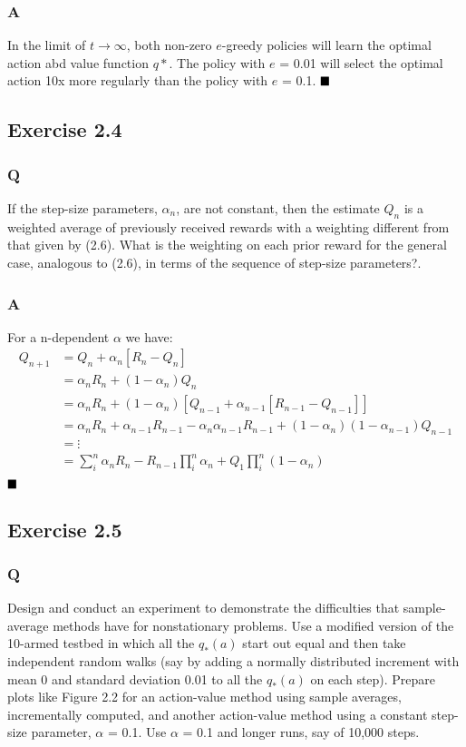 \subsubsection*{A}
In the limit of \(t \rightarrow \infty\), both non-zero \(e\)-greedy policies will learn the optimal action abd value function \(q*\). The policy with \(e\) = 0.01 will select the optimal action 10x more regularly than the policy with \(e\) = 0.1.
$
\hfill \blacksquare
$

\subsection{Exercise 2.4}
\subsubsection*{Q}
If the step-size parameters, \(\alpha_n\), are not constant, then the estimate \(Q_n\) is a weighted average of previously received rewards with a weighting different from that given by (2.6). What is the weighting on each prior reward for the general case, analogous to (2.6), in terms of the sequence of step-size parameters?.

\subsubsection*{A}
For a n-dependent \(\alpha\) we have:
\begin{align}
	Q_{n+1} &= Q_n +\alpha_n \left[R_n - Q_n\right] \nonumber \\
	&= \alpha_n R_n + (1-\alpha_n) Q_n\nonumber \\
	&= \alpha_n R_n + (1-\alpha_n) \left[Q_{n-1} + \alpha_{n-1} \left[R_{n-1} - Q_{n-1} \right]\right]\nonumber \\
	&= \alpha_n R_n + \alpha_{n-1} R_{n-1} - \alpha_n \alpha_{n-1} R_{n-1} + (1-\alpha_n)(1-\alpha_{n-1}) Q_{n-1} \nonumber \\
	&= \vdots \nonumber \\
	&= \sum_{i}^{n} \alpha_n R_n - R_{n-1} \prod_{i}^{n} \alpha_n + Q_{1} \prod_{i}^{n}(1-\alpha_n) \\
\end{align}
$
\hfill \blacksquare
$

\subsection{Exercise 2.5}
\subsubsection*{Q}
Design and conduct an experiment to demonstrate the difficulties that sample-average methods have for nonstationary problems. Use a modified version of the 10-armed testbed in which all the \(q_*(a)\) start out equal and then take independent random walks (say by adding a normally distributed increment with mean 0 and standard deviation 0.01 to all the \(q_*(a)\)  on each step). Prepare plots like Figure 2.2 for an action-value method using sample averages, incrementally computed, and another action-value method using a constant step-size parameter, \(\alpha\) = 0.1. Use \(\alpha\) = 0.1 and longer runs, say of 10,000 steps.

